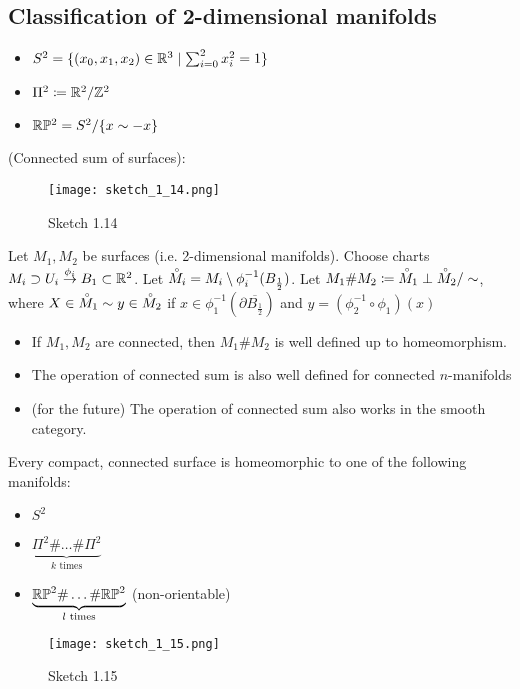 \subsection{Classification of 2-dimensional manifolds}
\begin{itemize}
    \item \(S^2=\{(x_0,x_1,x_2)\in\mathbb{R}^3\mid \sum_{i=0}^2 x_i^2=1\}\)
    \item \(\Pi^2 \coloneqq \mathbb{R}^2/\mathbb{Z}^2\)
    \item \(\mathbb{R}\mathbb{P}^2=S^2/\{x\sim -x\}\)
\end{itemize}

(Connected sum of surfaces):
\begin{figure}[H]
    \centering
    \texttt{[image: sketch\_1\_14.png]}
    \caption{Sketch 1.14}
\end{figure}
Let \(M_1,M_2\) be surfaces (i.e. 2-dimensional manifolds). Choose charts \(M_i\supset U_i\stackrel{\phi_i}{\to} B_1\subset \mathbb{R}^2\).
Let \(\accentset{\circ}{M}_i = M_i \setminus \phi_i^{-1}(B_{\frac{1}{2}})\). Let \(M_1 \# M_2 \coloneqq \accentset{\circ}{M}_1 \perp \accentset{\circ}{M}_2 /\sim\),
where \(X\in \accentset{\circ}{M}_1 \sim y\in \accentset{\circ}{M}_2\) if \(x\in \phi_1^{-1}(\partial \overline{B_{\frac{1}{2}}})\) and \(y=(\phi_2^{-1}\circ \phi_1) (x)\)

\begin{itemize}
    \item If \(M_1,M_2\) are connected, then \(M_1\# M_2\) is well defined up to 
    homeomorphism.
    \item The operation of connected sum is also well defined for connected \(n\)-manifolds 
    \item (for the future) The operation of connected sum also works in the smooth category.
\end{itemize} 

\begin{theorem}\label{thm:1.10}
    Every compact, connected surface is homeomorphic to one of the following manifolds:
    \begin{itemize}
        \item \(S^2\)
        \item \(\underbrace{\Pi^2\# \dots \# \Pi^2}_{k\text{ times}}\)
        \item \(\underbrace{\mathbb{R}\mathbb{P}^2\# \dots \# \mathbb{R}\mathbb{P}^2}_{l\text{ times}}\) (non-orientable)
    \end{itemize}
    \begin{figure}[H]
        \centering
        \texttt{[image: sketch\_1\_15.png]}
        \caption{Sketch 1.15}
    \end{figure}
\end{theorem}

